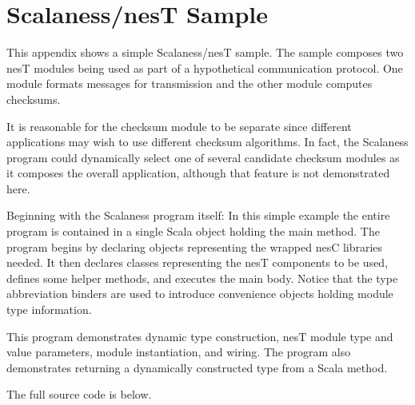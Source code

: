 
\chapter{Scalaness/nesT Sample}
\label{chapter-sample}


This appendix shows a simple Scalaness/nesT sample. The sample composes two nesT modules being
used as part of a hypothetical communication protocol. One module formats messages for
transmission and the other module computes checksums.

It is reasonable for the checksum module to be separate since different applications may wish to
use different checksum algorithms. In fact, the Scalaness program could dynamically select one
of several candidate checksum modules as it composes the overall application, although that
feature is not demonstrated here.

Beginning with the Scalaness program itself: In this simple example the entire program is
contained in a single Scala object holding the main method. The program begins by declaring
objects representing the wrapped nesC libraries needed. It then declares classes representing
the nesT components to be used, defines some helper methods, and executes the main body. Notice
that the type abbreviation binders \cite{watson-masters-2013} are used to introduce convenience
objects holding module type information.

This program demonstrates dynamic type construction, nesT module type and value parameters,
module instantiation, and wiring. The program also demonstrates returning a dynamically
constructed type from a Scala method.

The full source code is below.

